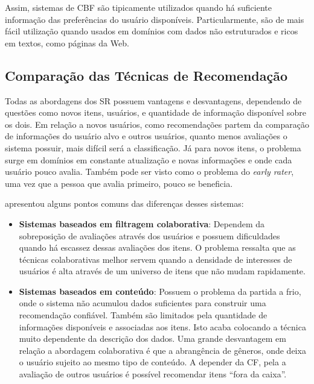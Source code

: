 Assim, sistemas de CBF são tipicamente utilizados quando há suficiente informação das preferências do usuário disponíveis. Particularmente, são de mais fácil utilização quando usados em domínios com dados não estruturados e ricos em textos, como páginas da Web.

	
\subsection{Comparação das Técnicas de Recomendação}

Todas as abordagens dos SR possuem vantagens e desvantagens, dependendo de questões como novos itens, usuários, e quantidade de informação disponível sobre os dois. Em relação a novos usuários, como recomendações partem da comparação de informações do usuário alvo e outros usuários, quanto menos avaliações o sistema possuir, mais difícil será a classificação. Já para novos itens, o problema surge em domínios em constante atualização e novas informações e onde cada usuário pouco avalia. Também pode ser visto como o problema do \textit{early rater}, uma vez que a pessoa que avalia primeiro, pouco se beneficia.

\cite{Burke:2002:HRS:586321.586352} apresentou alguns pontos comuns das diferenças desses sistemas:

\begin{itemize}
	\item{\textbf{Sistemas baseados em filtragem colaborativa}: Dependem da sobreposição de avaliações através dos usuários e possuem dificuldades quando há escassez dessas avaliações dos itens. O problema ressalta que as técnicas colaborativas melhor servem quando a densidade de interesses de usuários é alta através de um universo de itens que não mudam rapidamente.} 

	\item{\textbf{Sistemas baseados em conteúdo}: Possuem o problema da partida a frio, onde o sistema não acumulou dados suficientes para construir uma recomendação confiável. Também são limitados pela quantidade de informações disponíveis e associadas aos itens. Isto acaba colocando a técnica muito dependente da descrição dos dados. Uma grande desvantagem em relação a abordagem colaborativa é que a abrangência de gêneros, onde deixa o usuário sujeito ao mesmo tipo de conteúdo. A depender da CF, pela a avaliação de outros usuários é possível recomendar itens “fora da caixa”.}
\end{itemize}

